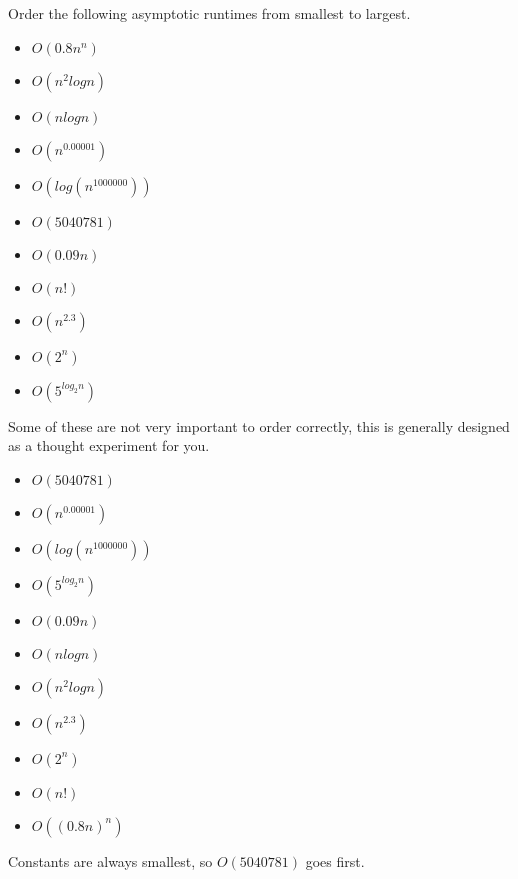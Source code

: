 \begin{blocksection}
Order the following asymptotic runtimes from smallest to largest. 
\begin{itemize}
    \item $O(0.8n^n)$
    \item $O(n^2logn)$
    \item $O(nlogn)$
    \item $O(n^{0.00001})$
    \item $O(log(n^{1000000}))$
    \item $O(5040781)$
    \item $O(0.09n)$
    \item $O(n!)$
    \item $O(n^2.3)$
    \item $O(2^n)$
    \item $O(5^{log_2 n})$
\end{itemize}

\begin{solution}[0.25in]
Some of these are not very important to order correctly, this is generally designed as a thought experiment for you. 
\begin{itemize}
    \item $O(5040781)$
    \item $O(n^{0.00001})$
    \item $O(log(n^{1000000}))$
    \item $O(5^{log_2 n})$
    \item $O(0.09n)$
    \item $O(nlogn)$
    \item $O(n^2logn)$
    \item $O(n^2.3)$
    \item $O(2^n)$
    \item $O(n!)$
    \item $O((0.8n)^n)$
\end{itemize}
Constants are always smallest, so $O(5040781)$ goes first. 
\end{solution}
\end{blocksection}
